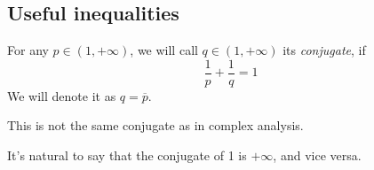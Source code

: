 \subsection{Useful inequalities}
\begin{definition}[Conjugate]
    For any $p \in (1, +\infty)$, we will call $q \in (1, +\infty)$
    its \textit{conjugate}, if 
    \[ \frac{1}{p} + \frac{1}{q} = 1 \]
    We will denote it as $q = \overline{p}$.
\end{definition}
\begin{remark}
    This is not the same conjugate as in complex analysis.
\end{remark}
\begin{remark}
    It's natural to say that the conjugate of 1 is $+\infty$, and vice versa.
\end{remark}


